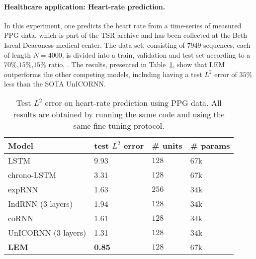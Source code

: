 \documentclass{article} \usepackage{iclr2022_conference,times}
\newcommand{\Tref}[1]{Table~\ref{#1}}
\begin{document}
\paragraph{Healthcare application: Heart-rate prediction.}
In this experiment, one predicts the heart rate from a time-series of measured PPG data, which is part of the TSR archive \citep{ai_healthcare} and has been collected at the Beth Isreal Deaconess medical center. The data set, consisting of $7949$ sequences, each of length $N=4000$, is divided into a train, validation and test set according to a $70$\%,$15$\%,$15$\% ratio, \citep{log_ode,unicornn}. The results, presented in \Tref{tab:medical}, show that LEM outperforms the other competing models, including having a test $L^2$ error of $35\%$ less than the SOTA UnICORNN. 
\begin{table}[ht!]
  \caption{Test $L^2$ error on heart-rate prediction using PPG data. All results are obtained by running the same code and using the same fine-tuning protocol.}
  \label{tab:medical}
  \centering
  \begin{tabular}{llll}
    \toprule
    \cmidrule(r){1-4}
    Model & test $L^2$ error & \# units & \# params \\
    \midrule
LSTM  & 9.93 & $128$ & $67$k \\
chrono-LSTM  & 3.31 & $128$ & $67$k \\
expRNN &1.63 & $256$ & $34$k \\
IndRNN (3 layers) & 1.94 & $128$ & $34$k \\
coRNN & 1.61 & $128$ & $34$k \\
UnICORNN (3 layers) & 1.31 & $128$ & $34$k \\
\textbf{LEM} & \textbf{0.85} & $128$ & $67$k \\
    \bottomrule
  \end{tabular}
\end{table}
\end{document}
